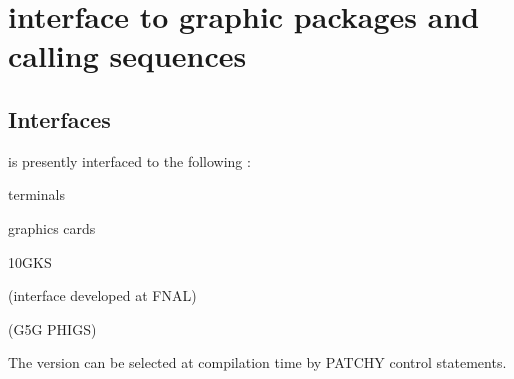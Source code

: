 
\chapter{\HIGZ{} interface to graphic packages and calling sequences}

\section{Interfaces}
\par
\HIGZ{} is presently interfaced to the following \UGP:
\begin{ULc}
\item {}
\item \GL
\item \GPR
\item \PS
\item \FALCO{} terminals
\item \MSDOS{} graphics cards
\item \MAC
\item \GKSGRAL
\item \PLOT10GKS
\item \MGKS
\item \NOVAGKS
\item \DECGKS
\item \ATCGKS
\item \SUNGKS
\item \UNIGKS
\item {} (interface developed at FNAL)
\item \GPHIGS{} (G5G PHIGS)
\item \GDDM
\end{ULc}
The \UGP{} version can be selected at compilation time by PATCHY control
statements.

